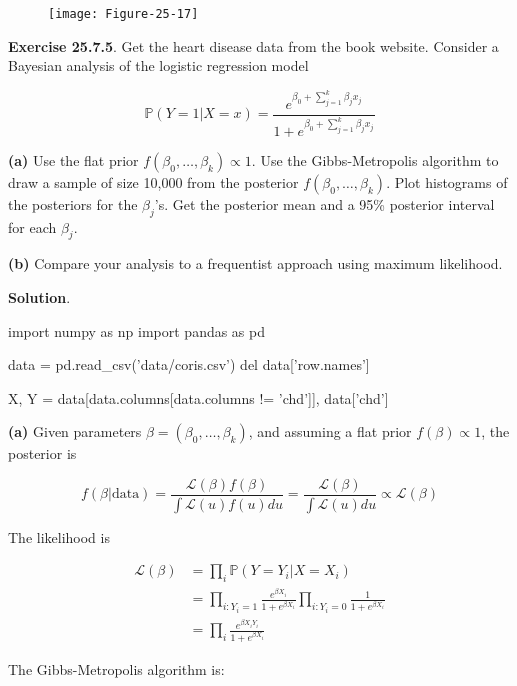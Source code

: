 \begin{figure}[H]
\texttt{[image: Figure-25-17]}
\end{figure}

\textbf{Exercise 25.7.5}. Get the heart disease data from the book
website. Consider a Bayesian analysis of the logistic regression model

\[ \mathbb{P}(Y = 1 | X = x) = \frac{e^{ \beta_0 + \sum_{j=1}^k \beta_j x_j } }{1 + e^{ \beta_0 + \sum_{j=1}^k \beta_j x_j }} \]

\textbf{(a)} Use the flat prior
\(f(\beta_0, \dots, \beta_k) \propto 1\). Use the Gibbs-Metropolis
algorithm to draw a sample of size 10,000 from the posterior
\(f(\beta_0, \dots, \beta_k)\). Plot histograms of the posteriors for
the \(\beta_j\)'s. Get the posterior mean and a 95\% posterior interval
for each \(\beta_j\).

\textbf{(b)} Compare your analysis to a frequentist approach using
maximum likelihood.

\textbf{Solution}.

\begin{python}
import numpy as np
import pandas as pd

data = pd.read_csv('data/coris.csv')
del data['row.names']

X, Y = data[data.columns[data.columns != 'chd']], data['chd']
\end{python}

\textbf{(a)} Given parameters \(\beta = (\beta_0, \dots, \beta_k)\), and
assuming a flat prior \(f(\beta) \propto 1\), the posterior is

\[ f(\beta | \text{data}) = \frac{\mathcal{L}(\beta) f(\beta)}{\int \mathcal{L}(u) f(u) du} = \frac{\mathcal{L}(\beta)}{\int \mathcal{L}(u) du} \propto \mathcal{L}(\beta) \]

The likelihood is

\[ 
\begin{align}
\mathcal{L}(\beta) &= \prod_i \mathbb{P}(Y = Y_i | X = X_i)  \\
&= \prod_{i: Y_i = 1} \frac{e^{ \beta X_i } }{1 + e^{ \beta X_i }} \prod_{i: Y_i = 0} \frac{1}{1 + e^{ \beta X_i }} \\
&= \prod_i \frac{e^{ \beta X_i Y_i } }{1 + e^{ \beta X_i }}
\end{align}
\]

The Gibbs-Metropolis algorithm is:

